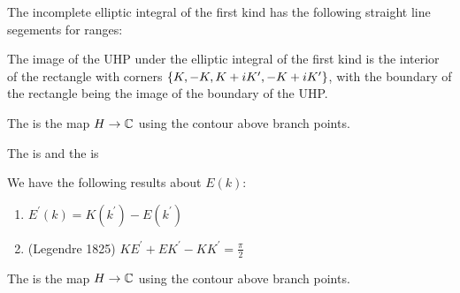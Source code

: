 \documentclass{article}
\begin{document}
\begin{prop}
	The incomplete elliptic integral of the first kind has the following straight line segements for ranges:
\end{prop}

\begin{corollary}
	The image of the UHP under the elliptic integral of the first kind is the interior of the rectangle with corners $\left\{ K,-K,K+iK^\prime, -K+iK^\prime \right\}$, with the boundary of the rectangle being the image of the boundary of the UHP.
\end{corollary}

\begin{definition}
	The  is the map $H\to \mathbb{C}$ 
using the contour above branch points.
\end{definition}

\begin{definition}
	The  is 
	and the  is 
\end{definition}

\begin{prop}
	We have the following results about $E(k)$:
	\begin{enumerate}
		\item $E^\prime(k) = K(k^\prime) - E(k^\prime)$
		\item (Legendre 1825) $KE^\prime + EK^\prime - KK^\prime = \frac{\pi}{2}$
	\end{enumerate}
\end{prop}

\begin{definition}
	The  is the map $H \to \mathbb{C}$ 
using the contour above branch points.
\end{definition}
\end{document}
